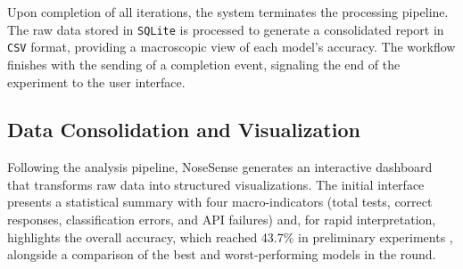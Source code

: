 \documentclass[sigconf]{acmart}
\begin{document}
Upon completion of all iterations, the system terminates the processing pipeline. The raw data stored in \texttt{SQLite} is processed to generate a consolidated report in \texttt{CSV} format, providing a macroscopic view of each model's accuracy. The workflow finishes with the sending of a completion event, signaling the end of the experiment to the user interface.



\subsection{Data Consolidation and Visualization}
\label{subsec:visualizacao}

Following the analysis pipeline, NoseSense generates an interactive dashboard that transforms raw data into structured visualizations. The initial interface presents a statistical summary with four macro-indicators (total tests, correct responses, classification errors, and API failures) and, for rapid interpretation, highlights the overall accuracy, which reached 43.7\% in preliminary experiments , alongside a comparison of the best and worst-performing models in the round.
\end{document}
